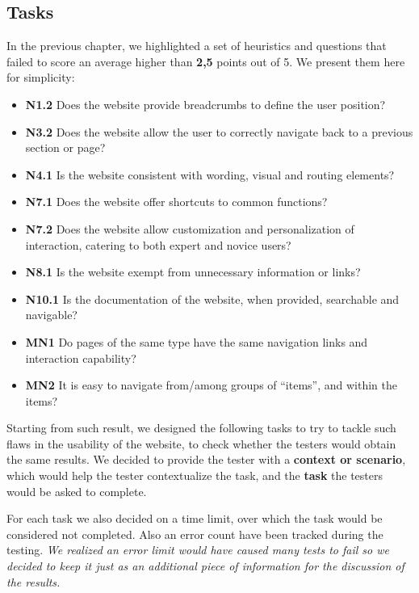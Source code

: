 \subsection{Tasks}
In the previous chapter, we highlighted a set of heuristics and questions that failed to score an average higher than \textbf{2,5} points out of 5. We present them here for simplicity:
\begin{itemize}
	\item \textbf{N1.2} Does the website provide breadcrumbs to define the user position?
	\item \textbf{N3.2} Does the website allow the user to correctly navigate back to a previous section or page?
	\item \textbf{N4.1} Is the website consistent with wording, visual and routing elements?
	\item \textbf{N7.1} Does the website offer shortcuts to common functions?
	\item \textbf{N7.2} Does the website allow customization and personalization of interaction, catering to both expert and novice users?
	\item \textbf{N8.1} Is the website exempt from unnecessary information or links?
	\item \textbf{N10.1} Is the documentation of the website, when provided, searchable and navigable?
	\item \textbf{MN1} Do pages of the same type have the same navigation links and interaction capability?
	\item \textbf{MN2} It is easy to navigate from/among groups of “items”, and within the items?
\end{itemize}

Starting from such result, we designed the following tasks to try to tackle such flaws in the usability of the website, to check whether the testers would obtain the same results. We decided to provide the tester with a \textbf{context or scenario}, which would help the tester contextualize the task, and the \textbf{task} the testers would be asked to complete.

For each task we also decided on a time limit, over which the task would be considered not completed. Also an error count have been tracked during the testing. \textit{We realized an error limit would have caused many tests to fail so we decided to keep it just as an additional piece of information for the discussion of the results.}


